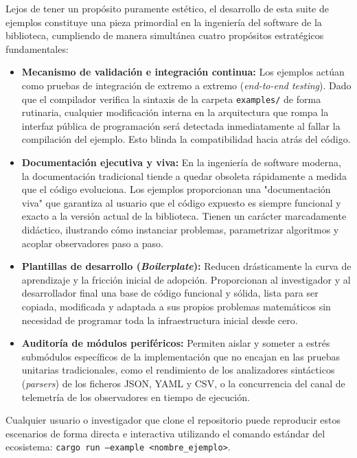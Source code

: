 \documentclass[12pt,a4paper,twoside,openright]{book}
\begin{document}
    Lejos de tener un propósito puramente estético, el desarrollo de esta suite de ejemplos constituye una pieza primordial en la ingeniería del software de la biblioteca, cumpliendo de manera simultánea cuatro propósitos estratégicos fundamentales:

\begin{itemize}
    \item \textbf{Mecanismo de validación e integración continua:} Los ejemplos actúan como pruebas de integración de extremo a extremo (\textit{end-to-end testing}). Dado que el compilador verifica la sintaxis de la carpeta \texttt{examples/} de forma rutinaria, cualquier modificación interna en la arquitectura que rompa la interfaz pública de programación será detectada inmediatamente al fallar la compilación del ejemplo. Esto blinda la compatibilidad hacia atrás del código.
    
    \item \textbf{Documentación ejecutiva y viva:} En la ingeniería de software moderna, la documentación tradicional tiende a quedar obsoleta rápidamente a medida que el código evoluciona. Los ejemplos proporcionan una "documentación viva" que garantiza al usuario que el código expuesto es siempre funcional y exacto a la versión actual de la biblioteca. Tienen un carácter marcadamente didáctico, ilustrando cómo instanciar problemas, parametrizar algoritmos y acoplar observadores paso a paso.
    
    \item \textbf{Plantillas de desarrollo (\textit{Boilerplate}):} Reducen drásticamente la curva de aprendizaje y la fricción inicial de adopción. Proporcionan al investigador y al desarrollador final una base de código funcional y sólida, lista para ser copiada, modificada y adaptada a sus propios problemas matemáticos sin necesidad de programar toda la infraestructura inicial desde cero.
    
    \item \textbf{Auditoría de módulos periféricos:} Permiten aislar y someter a estrés submódulos específicos de la implementación que no encajan en las pruebas unitarias tradicionales, como el rendimiento de los analizadores sintácticos (\textit{parsers}) de los ficheros JSON, YAML y CSV, o la concurrencia del canal de telemetría de los observadores en tiempo de ejecución.
\end{itemize}

    Cualquier usuario o investigador que clone el repositorio puede reproducir estos escenarios de forma directa e interactiva utilizando el comando estándar del ecosistema: \texttt{cargo run --example <nombre\_ejemplo>}. 
\end{document}
